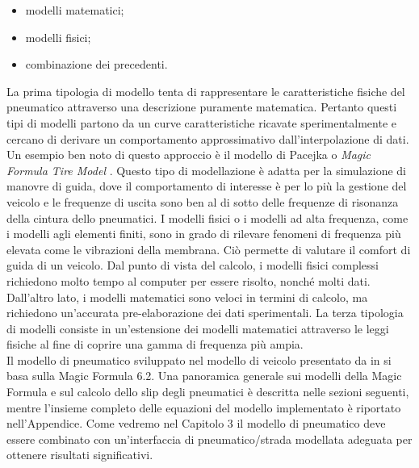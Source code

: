%
\begin{itemize}
	\item modelli matematici;
	\item modelli fisici;
	\item combinazione dei precedenti.
\end{itemize}
%
\noindent
La prima tipologia di modello tenta di rappresentare le caratteristiche fisiche del pneumatico attraverso una descrizione puramente matematica. Pertanto questi tipi di modelli partono da un curve caratteristiche ricavate sperimentalmente e cercano di derivare un comportamento approssimativo dall'interpolazione di dati. Un esempio ben noto di questo approccio è il modello di Pacejka o \textit{Magic Formula Tire Model} \cite{hans}. Questo tipo di modellazione è adatta per la simulazione di manovre di guida, dove il comportamento di interesse è per lo più la gestione del veicolo e le frequenze di uscita sono ben al di sotto delle frequenze di risonanza della cintura dello pneumatici. I modelli fisici o i modelli ad alta frequenza, come i modelli agli elementi finiti, sono in grado di rilevare fenomeni di frequenza più elevata come le vibrazioni della membrana. Ciò permette di valutare il comfort di guida di un veicolo. Dal punto di vista del calcolo, i modelli fisici complessi richiedono molto tempo al computer per essere risolto, nonché molti dati. Dall'altro lato, i modelli matematici sono veloci in termini di calcolo, ma richiedono un'accurata pre-elaborazione dei dati sperimentali. La terza tipologia di modelli consiste in un'estensione dei modelli matematici attraverso le leggi fisiche al fine di coprire una gamma di frequenza più ampia.\\
Il modello di pneumatico sviluppato nel modello di veicolo presentato da \citeauthor{Larcher} in \cite{Larcher} si basa sulla Magic Formula 6.2. Una panoramica generale sui modelli della Magic Formula e sul calcolo dello slip degli pneumatici è descritta nelle sezioni seguenti, mentre l'insieme completo delle equazioni del modello implementato è riportato nell'Appendice.
Come vedremo nel Capitolo 3 il modello di pneumatico deve essere combinato con un'interfaccia di pneumatico/strada modellata adeguata per ottenere risultati significativi.
%
